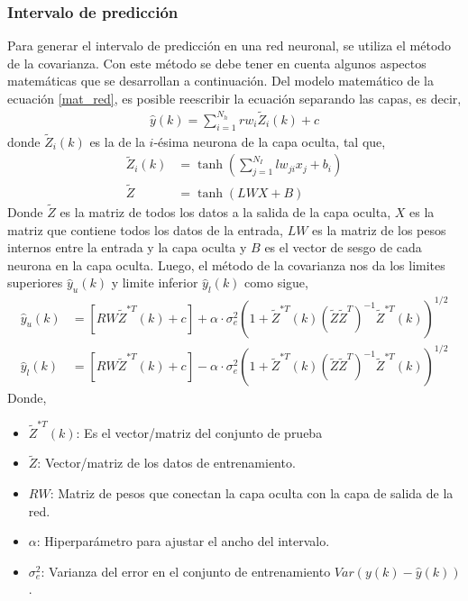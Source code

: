 \documentclass[12pt]{article}
\begin{document}
\subsubsection{Intervalo de predicción}
Para generar el intervalo de predicción en una red neuronal, se utiliza el método de la covarianza. Con este método se debe tener en cuenta algunos aspectos matemáticas que se desarrollan a continuación. Del modelo matemático de la ecuación \ref{mat_red}, es posible reescribir la ecuación separando las capas, es decir,
\begin{align}
\hat{y}(k) = \sum_{i=1}^{N_h} rw_i \tilde{Z}_i (k)  + c
\label{out_red}
\end{align}
donde $\tilde{Z}_i (k)$ es la de la $i$-ésima neurona de la capa oculta, tal que,
\begin{align}
	\tilde{Z}_i (k) &= \tanh\left(\sum_{j=1}^{N_I} lw_{ji} x_j + b_i\right) \nonumber \\
	\tilde{Z} &= \tanh\left(LW X + B\right)
\end{align}
Donde $\tilde{Z}$ es la matriz de todos los datos a la salida de la capa oculta, $X$ es la matriz que contiene todos los datos de la entrada, $LW$ es la matriz de los pesos internos entre la entrada y la capa oculta y $B$ es el vector de sesgo de cada neurona en la capa oculta. Luego, el método de la covarianza nos da los limites superiores $\hat{y}_u(k)$ y limite inferior $\hat{y}_l(k)$ como sigue,
\begin{align}
	\hat{y}_u(k) &= [RW \tilde{Z}^{*T}(k) + c] + \alpha \cdot \sigma_e^2 \left(1+\tilde{Z}^{*T}(k) \left(\tilde{Z} \tilde{Z}^T \right)^{-1} \tilde{Z}^{*T}(k) \right)^{1/2} \nonumber\\
	\hat{y}_l(k) &= [RW \tilde{Z}^{*T}(k) + c] - \alpha \cdot \sigma_e^2 \left(1 + \tilde{Z}^{*T}(k) \left(\tilde{Z} \tilde{Z}^T \right)^{-1} \tilde{Z}^{*T}(k) \right)^{1/2}
	\label{cov_red}
\end{align}
Donde,
\begin{itemize}
	\item $\tilde{Z}^{*T}(k)$: Es el vector/matriz del conjunto de prueba
	\item $\tilde{Z}$: Vector/matriz de los datos de entrenamiento.
	\item $RW$: Matriz de pesos que conectan la capa oculta con la capa de salida de la red.
	\item $\alpha$: Hiperparámetro para ajustar el ancho del intervalo.
	\item $\sigma_e^2$: Varianza del error en el conjunto de entrenamiento $Var(y(k) - \hat{y}(k))$.
\end{itemize}
\end{document}
